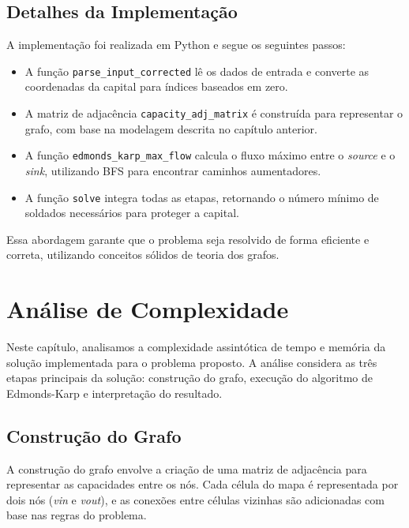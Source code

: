 \documentclass[a4paper,12pt]{article}
\begin{document}
\subsection*{Detalhes da Implementação}

A implementação foi realizada em Python e segue os seguintes passos:

\begin{itemize}
    \item A função \texttt{parse\_input\_corrected} lê os dados de entrada e converte as
          coordenadas da capital para índices baseados em zero.
    \item A matriz de adjacência \texttt{capacity\_adj\_matrix} é construída para
          representar o grafo, com base na modelagem descrita no capítulo anterior.
    \item A função \texttt{edmonds\_karp\_max\_flow} calcula o fluxo máximo entre o
          \textit{source} e o \textit{sink}, utilizando BFS para encontrar caminhos
          aumentadores.
    \item A função \texttt{solve} integra todas as etapas, retornando o número mínimo de
          soldados necessários para proteger a capital.
\end{itemize}

Essa abordagem garante que o problema seja resolvido de forma eficiente e
correta, utilizando conceitos sólidos de teoria dos grafos.

\section*{Análise de Complexidade}

Neste capítulo, analisamos a complexidade assintótica de tempo e memória da
solução implementada para o problema proposto. A análise considera as três
etapas principais da solução: construção do grafo, execução do algoritmo de
Edmonds-Karp e interpretação do resultado.

\subsection*{Construção do Grafo}

A construção do grafo envolve a criação de uma matriz de adjacência para
representar as capacidades entre os nós. Cada célula do mapa é representada por
dois nós (\textit{vin} e \textit{vout}), e as conexões entre células vizinhas
são adicionadas com base nas regras do problema.
\end{document}
